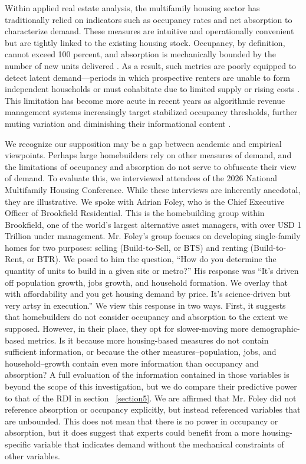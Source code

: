 \documentclass[pdflatex,sn-basic]{sn-jnl}%
\theoremstyle{thmstyleone}%
\theoremstyle{thmstyletwo}%
\theoremstyle{thmstylethree}%
\begin{document}
Within applied real estate analysis, the multifamily housing sector has traditionally
relied on indicators such as occupancy rates and net absorption to characterize demand.
These measures are intuitive and operationally convenient but are tightly linked to the
existing housing stock. Occupancy, by definition, cannot exceed 100 percent, and
absorption is mechanically bounded by the number of new units delivered
\cite{mueller1999real, gabriel2001rental}. As a result, such metrics are poorly equipped
to detect latent demand—periods in which prospective renters are unable to form
independent households or must cohabitate due to limited supply or rising costs
\cite{sirmans1991determinants, pyhrr1999real}. This limitation has become more acute in
recent years as algorithmic revenue management systems increasingly target stabilized
occupancy thresholds, further muting variation and diminishing their informational
content \cite{calder2024coordinated}.

We recognize our supposition may be a gap between academic and empirical viewpoints. Perhaps large homebuilders rely on other measures of demand, and the limitations of occupancy and absorption do not serve to obfuscate their view of demand. 
To evaluate this, we interviewed attendees of the 2026 National Multifamily Housing Conference. While these interviews are inherently anecdotal, they are illustrative. We spoke with Adrian Foley, who is the Chief Executive Officer of Brookfield Residential. This is the homebuilding group within Brookfield, one of the world's largest alternative asset managers, with over USD 1 Trillion under management. Mr. Foley's group focuses on developing single-family homes for two purposes: selling (Build-to-Sell, or BTS) and renting (Build-to-Rent, or BTR). We posed to him the question, ``How do you determine the quantity of units to build in a given site or metro?'' His response was
``It's driven off population growth, jobs growth, and household formation. We overlay that with affordability and you get housing demand by price.  It's science-driven but very artsy in execution.'' We view this response in two ways. First, it suggests that homebuilders do not consider occupancy and absorption to the extent we supposed. However, in their place, they opt for slower-moving more demographic-based metrics. Is it because more housing-based measures do not contain sufficient information, or because the other measures--population, jobs, and household--growth contain even more information than occupancy and absorption? A full evaluation of the information contained in those variables is beyond the scope of this investigation, but we do compare their predictive power to that of the RDI in section ~\ref{section5}. 
We are affirmed that Mr. Foley did not reference absorption or occupancy explicitly, but instead referenced variables that are unbounded. This does not mean that there is no power in occupancy or absorption, but it does suggest that experts could benefit from a more housing-specific variable that indicates demand without the mechanical constraints of other variables. 
\end{document}
